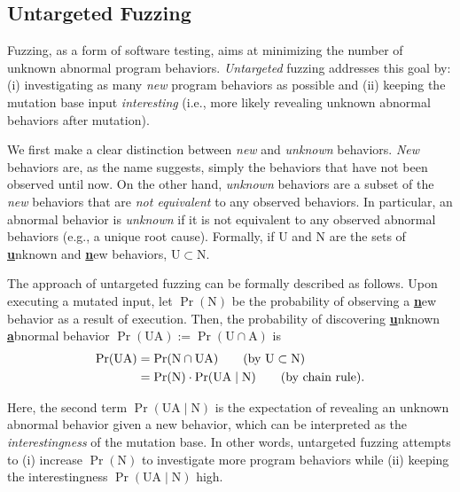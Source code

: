\documentclass[letterpaper,twocolumn,10pt]{article}
\begin{document}

\subsection{Untargeted Fuzzing}
\label{s:fuzz:unfuzz}

Fuzzing, as a form of software testing, aims at minimizing the number of unknown
abnormal program behaviors. \emph{Untargeted} fuzzing addresses this goal by:
(i) investigating as many \emph{new} program behaviors as possible and (ii)
keeping the mutation base input \emph{interesting} (i.e., more likely revealing
unknown abnormal behaviors after mutation).

%
We first make a clear distinction between \emph{new} and \emph{unknown} 
behaviors. \emph{New} behaviors are, as the name suggests, simply the behaviors 
that have not been observed until now. On the other hand, \emph{unknown}
behaviors are a subset of the \emph{new} behaviors that are \emph{not
equivalent} to any observed behaviors. In particular, an abnormal behavior is
\emph{unknown} if it is not equivalent to any observed abnormal behaviors (e.g.,
a unique root cause). Formally, if $\mathrm{U}$ and $\mathrm{N}$ are the sets of
\underline{\textbf{u}}nknown and \underline{\textbf{n}}ew behaviors,
$\mathrm{U} \subset \mathrm{N}$.

%
The approach of untargeted fuzzing can be formally described as follows. Upon
executing a mutated input, let $\Pr(\mathrm{N})$ be the probability of observing a
\underline{\textbf{n}}ew behavior as a result of execution. Then, the
probability of discovering \underline{\textbf{u}}nknown
\underline{\textbf{a}}bnormal behavior $\Pr(\mathrm{UA}) := \Pr(\mathrm{U} \cap
\mathrm{A})$ is
%
\begin{align}
  \Pr(\mathrm{UA}) 
      &= \Pr(\mathrm{N} \cap \mathrm{UA}) \tag{by $\mathrm{U} \subset \mathrm{N}$} \\
      &= \Pr(\mathrm{N}) \cdot \Pr(\mathrm{UA} \mid \mathrm{N}) \tag{by chain rule}. 
\end{align}

Here, the second term $\Pr(\mathrm{UA} \mid \mathrm{N})$ is the expectation of
revealing an unknown abnormal behavior given a new behavior, which can be
interpreted as the \emph{interestingness} of the mutation base. In other words,
untargeted fuzzing attempts to (i) increase $\Pr(\mathrm{N})$ to investigate
more program behaviors while (ii) keeping the interestingness $\Pr(\mathrm{UA}
\mid \mathrm{N})$ high.
%
\end{document}
